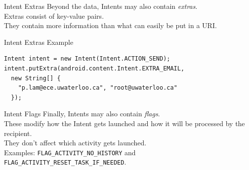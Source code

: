 \documentclass[aspectratio=169]{beamer}
\begin{document}
\begin{frame}{Intent Extras}
\Large
Beyond the data, Intents may also contain \emph{extras}.  \\
\vspace{1em}
Extras consist of key-value pairs.  \\
\vspace{1em}
They contain more information than what can easily be put in a URI.
\end{frame}



\begin{frame}[fragile]{Intent Extras Example}
\begin{Verbatim}[fontsize=\large]
Intent intent = new Intent(Intent.ACTION_SEND);
intent.putExtra(android.content.Intent.EXTRA_EMAIL,
  new String[] {
    "p.lam@ece.uwaterloo.ca", "root@uwaterloo.ca"
  });
\end{Verbatim}
\vspace{1em}
\end{frame}



\begin{frame}{Intent Flags}
\large
Finally, Intents may also contain \emph{flags}. \\
\vspace{1em}
These modify how the
Intent gets launched and how it will be processed by the recipient. \\
\vspace{1em}
They don't affect which activity gets launched. \\
\vspace{1em}
Examples: {\tt FLAG\_ACTIVITY\_NO\_HISTORY} and 
{\tt FLAG\_ACTIVITY\_RESET\_TASK\_IF\_NEEDED}.
\end{frame}
\end{document}
